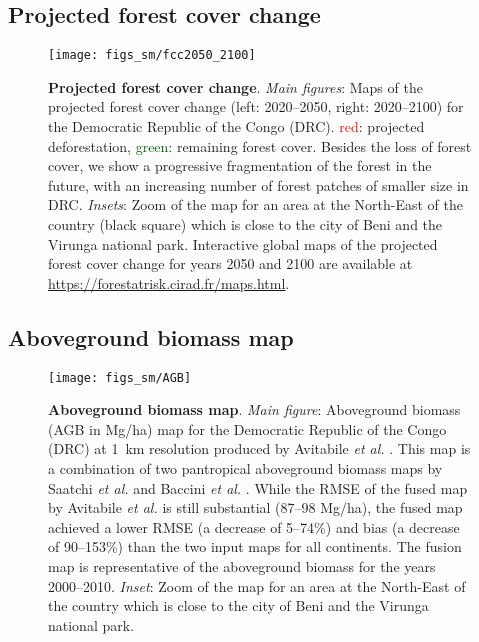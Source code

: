 \documentclass[
  12pt,
]{article}
\begin{document}
\hypertarget{projected-forest-cover-change}{%
\subsection{Projected forest cover change}\label{projected-forest-cover-change}}



\begin{figure}[H]

{\centering \texttt{[image: figs\_sm/fcc2050\_2100]} 

}

\caption{\textbf{Projected forest cover change}. \emph{Main figures}: Maps of the projected forest cover change (left: 2020--2050, right: 2020--2100) for the Democratic Republic of the Congo (DRC). \textcolor{red}{red}: projected deforestation, \textcolor{darkgreen}{green}: remaining forest cover. Besides the loss of forest cover, we show a progressive fragmentation of the forest in the future, with an increasing number of forest patches of smaller size in DRC. \emph{Insets}: Zoom of the map for an area at the North-East of the country (black square) which is close to the city of Beni and the Virunga national park. Interactive global maps of the projected forest cover change for years 2050 and 2100 are available at \url{https://forestatrisk.cirad.fr/maps.html}.}\label{fig:sm-proj}
\end{figure}

\hypertarget{aboveground-biomass-map}{%
\subsection{Aboveground biomass map}\label{aboveground-biomass-map}}



\begin{figure}[H]

{\centering \texttt{[image: figs\_sm/AGB]} 

}

\caption{\textbf{Aboveground biomass map}. \emph{Main figure}: Aboveground biomass (AGB in Mg/ha) map for the Democratic Republic of the Congo (DRC) at 1~km resolution produced by Avitabile \emph{et al.} \citep{Avitabile2016}. This map is a combination of two pantropical aboveground biomass maps by Saatchi \emph{et al.} \citep{Saatchi2011} and Baccini \emph{et al.} \citep{Baccini2012}. While the RMSE of the fused map by Avitabile \emph{et al.} \citep{Avitabile2016} is still substantial (87--98 Mg/ha), the fused map achieved a lower RMSE (a decrease of 5--74\%) and bias (a decrease of 90--153\%) than the two input maps for all continents. The fusion map is representative of the aboveground biomass for the years 2000--2010. \emph{Inset}: Zoom of the map for an area at the North-East of the country which is close to the city of Beni and the Virunga national park.}\label{fig:agb}
\end{figure}
\end{document}
